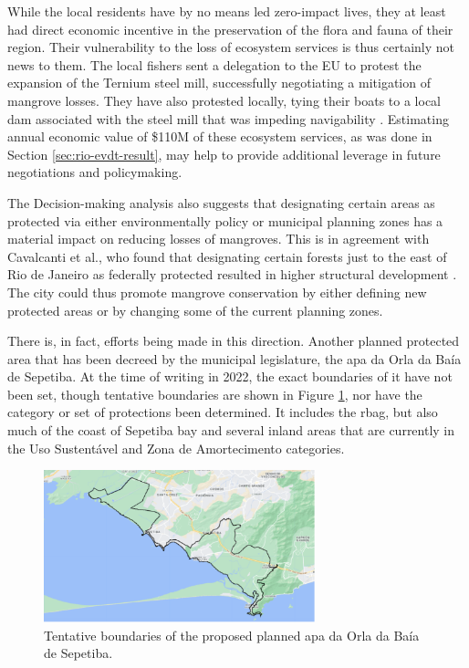 While the local residents have by no means led zero-impact lives, they at least had direct economic incentive in the preservation of the flora and fauna of their region. Their vulnerability to the loss of ecosystem services is thus certainly not news to them. The local fishers sent a delegation to the EU to protest the expansion of the Ternium steel mill, successfully negotiating a mitigation of mangrove losses. They have also protested locally, tying their boats to a local dam associated with the steel mill that was impeding navigability \cite{institutopacsSemPeixeSem2021}. Estimating annual economic value of \$110M of these ecosystem services, as was done in Section \ref{sec:rio-evdt-result}, may help to provide additional leverage in future negotiations and policymaking.

The Decision-making analysis also suggests that designating certain areas as protected via either environmentally policy or municipal planning zones has a material impact on reducing losses of mangroves. This is in agreement with Cavalcanti et al., who found that designating certain forests just to the east of Rio de Janeiro as federally protected resulted in higher structural development \cite{cavalcantiEvaluatingMangroveConservation2009}. The city could thus promote mangrove conservation by either defining new protected areas or by changing some of the current planning zones. 

There is, in fact, efforts being made in this direction. Another planned protected area that has been decreed by the municipal legislature, the \ac{apa} da Orla da Baía de Sepetiba. At the time of writing in 2022, the exact boundaries of it have not been set, though tentative boundaries are shown in Figure \ref{fig:apa_sepetiba}, nor have the category or set of protections been determined. It includes the \ac{rbag}, but also much of the coast of Sepetiba bay and several inland areas that are currently in the Uso Sustentável and Zona de Amortecimento categories. 

\begin{figure}[!htb] 
\centering
\includegraphics[width=0.7\textwidth]{Figures/chap4/apa_sepetiba.png}
\caption[APA da Orla da Baía de Sepetiba]{Tentative boundaries of the proposed planned \ac{apa} da Orla da Baía de Sepetiba.}
\label{fig:apa_sepetiba}
\end{figure}


